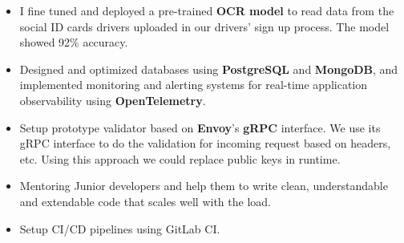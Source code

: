 \begin{itemize}
      \item I fine tuned and deployed a pre-trained \textbf{OCR model} to read data from the social ID cards drivers uploaded in our drivers' sign up process. The model showed 92\% accuracy.
      \item Designed and optimized databases using \textbf{PostgreSQL} and \textbf{MongoDB},
        and implemented monitoring and alerting systems for real-time application observability using \textbf{OpenTelemetry}.
      \item Setup prototype validator based on \textbf{Envoy}'s \textbf{gRPC} interface. We use its gRPC interface to do the validation for incoming request
            based on headers, etc. Using this approach we could replace public keys in runtime.
      \item Mentoring Junior developers and help them to write clean, understandable and extendable code that scales well with the load.
      \item Setup CI/CD pipelines using GitLab CI.
\end{itemize}

\vspace{0.5cm}

